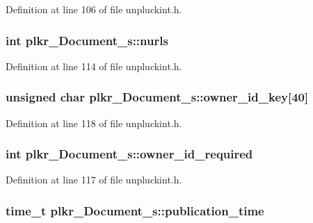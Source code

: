 Definition at line 106 of file unpluckint.\+h.

\hypertarget{structplkr__Document__s_a9ed11d122b2fe4b200fb727486501041}{
\subsubsection[{nurls}]{\setlength{\rightskip}{0pt plus 5cm}int plkr\+\_\+\+Document\+\_\+s\+::nurls}}\label{structplkr__Document__s_a9ed11d122b2fe4b200fb727486501041}


Definition at line 114 of file unpluckint.\+h.

\hypertarget{structplkr__Document__s_a7d7964829f29daa29f9d535723d638dc}{
\subsubsection[{owner\+\_\+id\+\_\+key}]{\setlength{\rightskip}{0pt plus 5cm}unsigned char plkr\+\_\+\+Document\+\_\+s\+::owner\+\_\+id\+\_\+key\mbox{[}40\mbox{]}}}\label{structplkr__Document__s_a7d7964829f29daa29f9d535723d638dc}


Definition at line 118 of file unpluckint.\+h.

\hypertarget{structplkr__Document__s_a5527d32cc4c4f3694a36fdcd96744905}{
\subsubsection[{owner\+\_\+id\+\_\+required}]{\setlength{\rightskip}{0pt plus 5cm}int plkr\+\_\+\+Document\+\_\+s\+::owner\+\_\+id\+\_\+required}}\label{structplkr__Document__s_a5527d32cc4c4f3694a36fdcd96744905}


Definition at line 117 of file unpluckint.\+h.

\hypertarget{structplkr__Document__s_a29ac543a7a36087e946457ff8709517b}{
\subsubsection[{publication\+\_\+time}]{\setlength{\rightskip}{0pt plus 5cm}time\+\_\+t plkr\+\_\+\+Document\+\_\+s\+::publication\+\_\+time}}\label{structplkr__Document__s_a29ac543a7a36087e946457ff8709517b}



